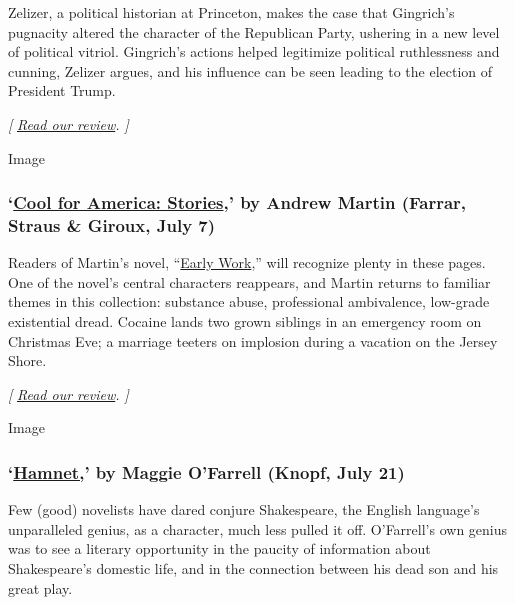 Zelizer, a political historian at Princeton, makes the case that
Gingrich's pugnacity altered the character of the Republican Party,
ushering in a new level of political vitriol. Gingrich's actions helped
legitimize political ruthlessness and cunning, Zelizer argues, and his
influence can be seen leading to the election of President Trump.

\emph{{[}}
\href{https://www.nytimes.com/2020/07/04/books/review-burning-down-house-newt-gingrich-julian-zelizer.html}{\emph{Read
our review}}\emph{. {]}}

Image

\hypertarget{cool-for-america-stories-by-andrew-martin-farrar-straus--giroux-july-7}{%
\subsubsection{\texorpdfstring{`\href{https://us.macmillan.com/books/9780374108168}{Cool
for America: Stories},' by Andrew Martin (Farrar, Straus \& Giroux, July
7)}{`Cool for America: Stories,' by Andrew Martin (Farrar, Straus \& Giroux, July 7)}}\label{cool-for-america-stories-by-andrew-martin-farrar-straus--giroux-july-7}}

Readers of Martin's novel,
``\href{https://www.nytimes.com/2018/07/25/books/review/andrew-martin-early-work.html}{Early
Work},'' will recognize plenty in these pages. One of the novel's
central characters reappears, and Martin returns to familiar themes in
this collection: substance abuse, professional ambivalence, low-grade
existential dread. Cocaine lands two grown siblings in an emergency room
on Christmas Eve; a marriage teeters on implosion during a vacation on
the Jersey Shore.

\emph{{[}}
\href{https://www.nytimes.com/2020/07/07/books/review/cool-for-america-andrew-martin.html}{\emph{Read
our review}}\emph{. {]}}

Image

\hypertarget{hamnet-by-maggie-ofarrell-knopf-july-21}{%
\subsubsection{\texorpdfstring{`\href{https://www.penguinrandomhouse.com/books/612385/hamnet-by-maggie-ofarrell/}{Hamnet,}'
by Maggie O'Farrell (Knopf, July
21)}{`Hamnet,' by Maggie O'Farrell (Knopf, July 21)}}\label{hamnet-by-maggie-ofarrell-knopf-july-21}}

Few (good) novelists have dared conjure Shakespeare, the English
language's unparalleled genius, as a character, much less pulled it off.
O'Farrell's own genius was to see a literary opportunity in the paucity
of information about Shakespeare's domestic life, and in the connection
between his dead son and his great play.

